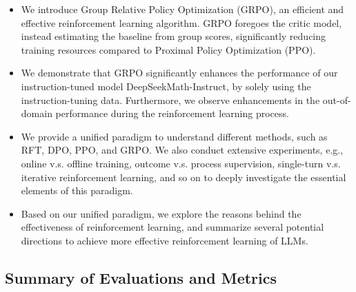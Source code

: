 \begin{itemize}[topsep=0pt]
    \item We introduce Group Relative Policy Optimization (GRPO), an efficient and effective reinforcement learning algorithm. GRPO foregoes the critic model, instead estimating the baseline from group scores, significantly reducing training resources compared to Proximal Policy Optimization (PPO).
    \item We demonstrate that GRPO significantly enhances the performance of our instruction-tuned model DeepSeekMath-Instruct, by solely using the instruction-tuning data. Furthermore, we observe enhancements in the out-of-domain performance during the reinforcement learning process.
    \item We provide a unified paradigm to understand different methods, such as RFT, DPO, PPO, and GRPO. We also conduct extensive experiments, e.g., online v.s. offline training, outcome v.s. process supervision, single-turn v.s. iterative reinforcement learning, and so on to deeply investigate the essential elements of this paradigm.
    \item Based on our unified paradigm, we explore the reasons behind the effectiveness of reinforcement learning, and summarize several potential directions to achieve more effective reinforcement learning of LLMs.
\end{itemize}

\subsection{Summary of Evaluations and Metrics}

